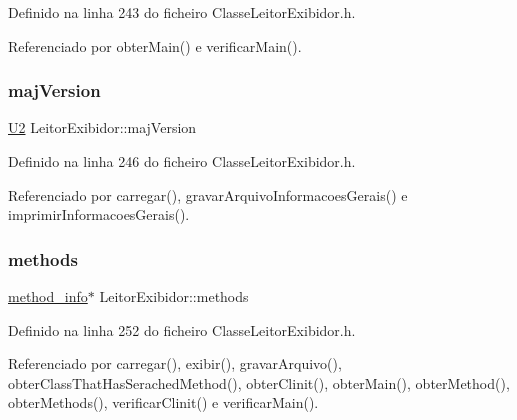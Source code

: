 Definido na linha 243 do ficheiro Classe\+Leitor\+Exibidor.\+h.



Referenciado por obter\+Main() e verificar\+Main().

\mbox{\label{classLeitorExibidor_a5c2cd58569e9c3fdc47c0bbab116b870}} 
\subsubsection{\texorpdfstring{maj\+Version}{majVersion}}
{\footnotesize\ttfamily \hyperlink{BasicTypes_8h_a90240657108b1b457eef9d3f76e0202e}{U2} Leitor\+Exibidor\+::maj\+Version\hspace{0.3cm}{\ttfamily [private]}}



Definido na linha 246 do ficheiro Classe\+Leitor\+Exibidor.\+h.



Referenciado por carregar(), gravar\+Arquivo\+Informacoes\+Gerais() e imprimir\+Informacoes\+Gerais().

\mbox{\label{classLeitorExibidor_a0c9110ffe495c55bedaafdc47656eaed}} 
\subsubsection{\texorpdfstring{methods}{methods}}
{\footnotesize\ttfamily \hyperlink{structmethod__info}{method\+\_\+info}$\ast$ Leitor\+Exibidor\+::methods\hspace{0.3cm}{\ttfamily [private]}}



Definido na linha 252 do ficheiro Classe\+Leitor\+Exibidor.\+h.



Referenciado por carregar(), exibir(), gravar\+Arquivo(), obter\+Class\+That\+Has\+Serached\+Method(), obter\+Clinit(), obter\+Main(), obter\+Method(), obter\+Methods(), verificar\+Clinit() e verificar\+Main().

\mbox{\label{classLeitorExibidor_a3f5d59fb172e478ab6d1a595a8b6c54a}} 
